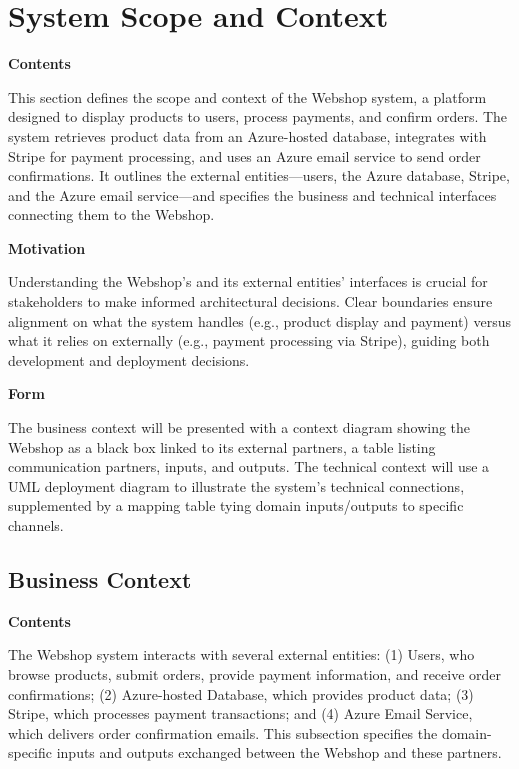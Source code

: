 \hypertarget{section-system-scope-and-context}{%
\section{System Scope and Context}\label{section-system-scope-and-context}}

\textbf{Contents}

This section defines the scope and context of the Webshop system, a platform designed to display products to users, process payments, and confirm orders. The system retrieves product data from an Azure-hosted database, integrates with Stripe for payment processing, and uses an Azure email service to send order confirmations. It outlines the external entities—users, the Azure database, Stripe, and the Azure email service—and specifies the business and technical interfaces connecting them to the Webshop.

\textbf{Motivation}

Understanding the Webshop's and its external entities' interfaces is crucial for stakeholders to make informed architectural decisions. Clear boundaries ensure alignment on what the system handles (e.g., product display and payment) versus what it relies on externally (e.g., payment processing via Stripe), guiding both development and deployment decisions.

\textbf{Form}

The business context will be presented with a context diagram showing the Webshop as a black box linked to its external partners, a table listing communication partners, inputs, and outputs. The technical context will use a UML deployment diagram to illustrate the system’s technical connections, supplemented by a mapping table tying domain inputs/outputs to specific channels.

\hypertarget{_business_context}{%
\subsection{Business Context}\label{_business_context}}

\textbf{Contents}

The Webshop system interacts with several external entities: (1) Users, who browse products, submit orders, provide payment information, and receive order confirmations; (2) Azure-hosted Database, which provides product data; (3) Stripe, which processes payment transactions; and (4) Azure Email Service, which delivers order confirmation emails. This subsection specifies the domain-specific inputs and outputs exchanged between the Webshop and these partners.

